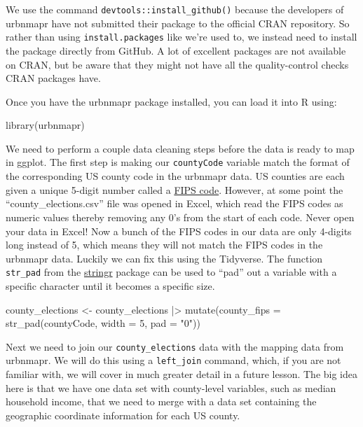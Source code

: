 \documentclass[
  letterpaper,
]{book}
\newenvironment{Shaded}{\begin{snugshade}}{\end{snugshade}}
\newcommand{\AttributeTok}[1]{\textcolor[rgb]{0.40,0.45,0.13}{#1}}
\newcommand{\DecValTok}[1]{\textcolor[rgb]{0.68,0.00,0.00}{#1}}
\newcommand{\FunctionTok}[1]{\textcolor[rgb]{0.28,0.35,0.67}{#1}}
\newcommand{\NormalTok}[1]{\textcolor[rgb]{0.00,0.23,0.31}{#1}}
\newcommand{\OtherTok}[1]{\textcolor[rgb]{0.00,0.23,0.31}{#1}}
\newcommand{\SpecialCharTok}[1]{\textcolor[rgb]{0.37,0.37,0.37}{#1}}
\newcommand{\StringTok}[1]{\textcolor[rgb]{0.13,0.47,0.30}{#1}}
\theoremstyle{definition}
\theoremstyle{definition}
\theoremstyle{plain}
\theoremstyle{definition}
\theoremstyle{plain}
\theoremstyle{plain}
\theoremstyle{remark}
\begin{document}
We use the command \texttt{devtools::install\_github()} because the
developers of urbnmapr have not submitted their package to the official
CRAN repository. So rather than using \texttt{install.packages} like
we're used to, we instead need to install the package directly from
GitHub. A lot of excellent packages are not available on CRAN, but be
aware that they might not have all the quality-control checks CRAN
packages have.

Once you have the urbnmapr package installed, you can load it into R
using:

\begin{Shaded}
\begin{Highlighting}[]
\FunctionTok{library}\NormalTok{(urbnmapr)}
\end{Highlighting}
\end{Shaded}

We need to perform a couple data cleaning steps before the data is ready
to map in ggplot. The first step is making our \texttt{countyCode}
variable match the format of the corresponding US county code in the
urbnmapr data. US counties are each given a unique 5-digit number called
a
\href{https://www.nrcs.usda.gov/wps/portal/nrcs/detail/national/home/?cid=nrcs143_013697}{FIPS
code}. However, at some point the ``county\_elections.csv'' file was
opened in Excel, which read the FIPS codes as numeric values thereby
removing any 0's from the start of each code. Never open your data in
Excel! Now a bunch of the FIPS codes in our data are only 4-digits long
instead of 5, which means they will not match the FIPS codes in the
urbnmapr data. Luckily we can fix this using the Tidyverse. The function
\texttt{str\_pad} from the
\href{https://stringr.tidyverse.org/}{stringr} package can be used to
``pad'' out a variable with a specific character until it becomes a
specific size.

\begin{Shaded}
\begin{Highlighting}[]
\NormalTok{county\_elections }\OtherTok{\textless{}{-}}\NormalTok{ county\_elections }\SpecialCharTok{|\textgreater{}} 
  \FunctionTok{mutate}\NormalTok{(}\AttributeTok{county\_fips =} \FunctionTok{str\_pad}\NormalTok{(countyCode, }\AttributeTok{width =} \DecValTok{5}\NormalTok{, }\AttributeTok{pad =} \StringTok{"0"}\NormalTok{))}
\end{Highlighting}
\end{Shaded}

Next we need to join our \texttt{county\_elections} data with the
mapping data from urbnmapr. We will do this using a \texttt{left\_join}
command, which, if you are not familiar with, we will cover in much
greater detail in a future lesson. The big idea here is that we have one
data set with county-level variables, such as median household income,
that we need to merge with a data set containing the geographic
coordinate information for each US county.
\end{document}
